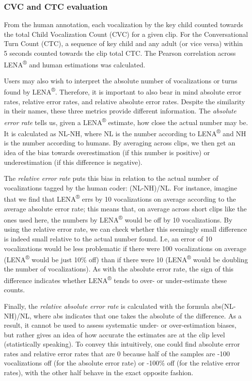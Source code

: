 \documentclass[english,table,man,floatsintext]{apa6}
\begin{document}
\hypertarget{cvc-and-ctc-evaluation}{%
\subsubsection{CVC and CTC evaluation}\label{cvc-and-ctc-evaluation}}

From the human annotation, each vocalization by the key child counted towards the total Child Vocalization Count (CVC) for a given clip. For the Conversational Turn Count (CTC), a sequence of key child and any adult (or vice versa) within 5 seconds counted towards the clip total CTC. The Pearson correlation across LENA\textsuperscript{®} and human estimations was calculated.

Users may also wish to interpret the absolute number of vocalizations or turns found by LENA\textsuperscript{®}. Therefore, it is important to also bear in mind absolute error rates, relative error rates, and relative absolute error rates. Despite the similarity in their names, these three metrics provide different information. The \emph{absolute error rate} tells us, given a LENA\textsuperscript{®} estimate, how close the actual number may be. It is calculated as NL-NH, where NL is the number according to LENA\textsuperscript{®} and NH is the number according to humans. By averaging across clips, we then get an idea of the bias towards overestimation (if this number is positive) or underestimation (if this difference is negative).

The \emph{relative error rate} puts this bias in relation to the actual number of vocalizations tagged by the human coder: (NL-NH)/NL. For instance, imagine that we find that LENA\textsuperscript{®} errs by 10 vocalizations on average according to the average absolute error rate; this means that, on average across short clips like the ones used here, the numbers by LENA\textsuperscript{®} would be off by 10 vocalizations. By using the relative error rate, we can check whether this seemingly small difference is indeed small relative to the actual number found. I.e, an error of 10 vocalizations would be less problematic if there were 100 vocalizations on average (LENA\textsuperscript{®} would be just 10\% off) than if there were 10 (LENA\textsuperscript{®} would be doubling the number of vocalizations). As with the absolute error rate, the sign of this difference indicates whether LENA\textsuperscript{®} tends to over- or under-estimate these counts.

Finally, the \emph{relative absolute error rate} is calculated with the formula abs(NL-NH)/NL, where abs indicates that one takes the absolute of the difference. As a result, it cannot be used to assess systematic under- or over-estimation biases, but rather gives an idea of how accurate the estimates are at the clip level (statistically speaking). To convey this intuitively, one could find absolute error rates and relative error rates that are 0 because half of the samples are -100 vocalizations off (for the absolute error rate) or -100\% off (for the relative error rates), with the other half behave in the exact opposite fashion.
\end{document}
